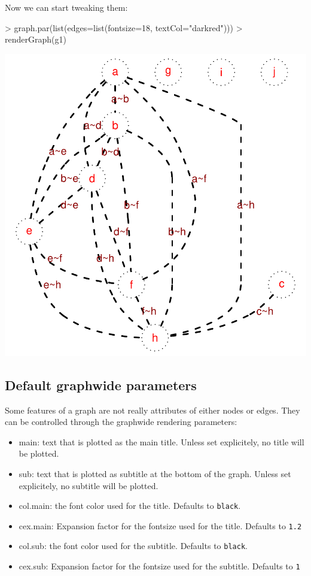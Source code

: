 \documentclass{article}
\newcommand{\Robject}[1]{{\texttt{#1}}}
\begin{document}
Now we can start tweaking them:
\begin{Schunk}
\begin{Sinput}
> graph.par(list(edges=list(fontsize=18, textCol="darkred")))
> renderGraph(g1)
\end{Sinput}
\end{Schunk}
\includegraphics{newRgraphvizInterface-tweaklabesl}


\subsection{Default graphwide parameters}
Some features of a graph are not really attributes of either nodes or
edges. They can be controlled through the graphwide rendering
parameters:

\begin{itemize}
\item{main:} {text that is plotted as the main title. Unless set
  explicitely, no title will be plotted.}
\item{sub:} {text that is plotted as subtitle at the bottom of the
  graph. Unless set explicitely, no subtitle will be plotted.}
\item{col.main:} {the font color used for the title. Defaults
  to \Robject{black}.}
\item{cex.main:} {Expansion factor for the fontsize used for the
  title. Defaults to \Robject{1.2}}
\item{col.sub:} {the font color used for the subtitle. Defaults
  to \Robject{black}.}
\item{cex.sub:} {Expansion factor for the fontsize used for the
  subtitle. Defaults to \Robject{1}}
\end{itemize}
\end{document}
